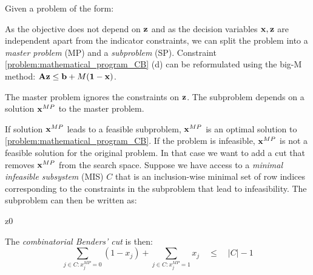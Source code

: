 Given a problem of the form:
As the objective does not depend on $\bold z$ and as the decision variables $\bold x, \bold z$ are independent apart from the indicator constraints, we can split the problem into a \textit{master problem} (MP) and a \textit{subproblem} (SP). Constraint \cref{problem:mathematical_program_CB} (d) can be reformulated using the big-M method: $\bold A \bold z \leq \bold b + M(\bold 1- \bold x)$.

The master problem ignores the constraints on $\bold z$. The subproblem depends on a solution $\bold x^{MP}$ to the master problem. 

If solution $\bold x^{MP}$ leads to a feasible subproblem, $\bold x^{MP}$ is an optimal solution to \cref{problem:mathematical_program_CB}. If the problem is infeasible, $\bold x^{MP}$ is not a feasible solution for the original problem. In that case we want to add a cut that removes $\bold x^{MP}$ from the search space. Suppose we have access to a \textit{minimal infeasible subsystem} (MIS) $C$ that is an inclusion-wise minimal set of row indices corresponding to the constraints in the subproblem that lead to infeasibility.
The subproblem can then be written as:
\begin{mini!}
    {\scriptstyle \bold z}{0}{}{}
\end{mini!}
The \textit{combinatorial Benders' cut} is then: 
\begin{equation*}
    \sum_{j \in C: x_j^{MP}=0} (1 - x_{j}) + \sum_{j \in C: x_j^{MP}=1} x_j \quad \leq \quad |C| -1
\end{equation*}

